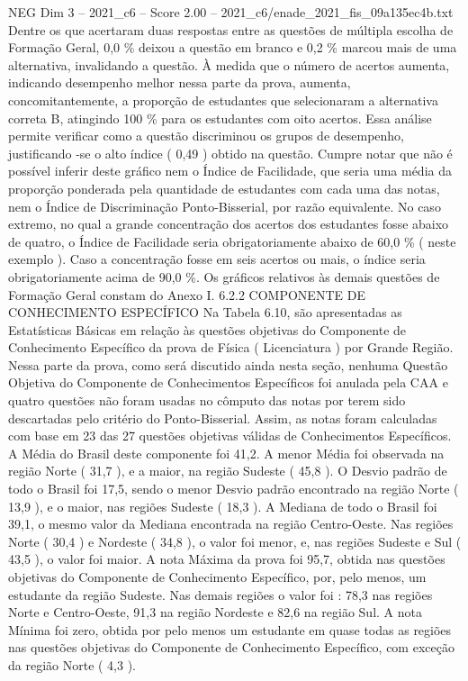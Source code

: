 \begin{textsample}{NEG Dim 3 – 2021\_c6 – Score 2.00 – 2021\_c6/enade\_2021\_fis\_09a135ec4b.txt}
Dentre os que acertaram duas respostas entre as questões de múltipla escolha de Formação Geral, 0,0 \% deixou a questão em branco e 0,2 \% marcou mais de uma alternativa, invalidando a questão.
À medida que o número de acertos aumenta, indicando desempenho melhor nessa parte da prova, aumenta, concomitantemente, a proporção de estudantes que selecionaram a alternativa correta B, atingindo 100 \% para os estudantes com oito acertos.
Essa análise permite verificar como a questão discriminou os grupos de desempenho, justificando -se o alto índice ( 0,49 ) obtido na questão.
Cumpre notar que não é possível inferir deste gráfico nem o Índice de Facilidade, que seria uma média da proporção ponderada pela quantidade de estudantes com cada uma das notas, nem o Índice de Discriminação Ponto-Bisserial, por razão equivalente.
No caso extremo, no qual a grande concentração dos acertos dos estudantes fosse abaixo de quatro, o Índice de Facilidade seria obrigatoriamente abaixo de 60,0 \% ( neste exemplo ).
Caso a concentração fosse em seis acertos ou mais, o índice seria obrigatoriamente acima de 90,0 \%.
Os gráficos relativos às demais questões de Formação Geral constam do Anexo I. 6.2.2 COMPONENTE DE CONHECIMENTO ESPECÍFICO Na Tabela 6.10, são apresentadas as Estatísticas Básicas em relação às questões objetivas do Componente de Conhecimento Específico da prova de Física ( Licenciatura ) por Grande Região.
Nessa parte da prova, como será discutido ainda nesta seção, nenhuma Questão Objetiva do Componente de Conhecimentos Específicos foi anulada pela CAA e quatro questões não foram usadas no cômputo das notas por terem sido descartadas pelo critério do Ponto-Bisserial.
Assim, as notas foram calculadas com base em 23 das 27 questões objetivas válidas de Conhecimentos Específicos.
A Média do Brasil deste componente foi 41,2.
A menor Média foi observada na região Norte ( 31,7 ), e a maior, na região Sudeste ( 45,8 ).
O Desvio padrão de todo o Brasil foi 17,5, sendo o menor Desvio padrão encontrado na região Norte ( 13,9 ), e o maior, nas regiões Sudeste ( 18,3 ).
A Mediana de todo o Brasil foi 39,1, o mesmo valor da Mediana encontrada na região Centro-Oeste.
Nas regiões Norte ( 30,4 ) e Nordeste ( 34,8 ), o valor foi menor, e, nas regiões Sudeste e Sul ( 43,5 ), o valor foi maior.
A nota Máxima da prova foi 95,7, obtida nas questões objetivas do Componente de Conhecimento Específico, por, pelo menos, um estudante da região Sudeste.
Nas demais regiões o valor foi : 78,3 nas regiões Norte e Centro-Oeste, 91,3 na região Nordeste e 82,6 na região Sul.
A nota Mínima foi zero, obtida por pelo menos um estudante em quase todas as regiões nas questões objetivas do Componente de Conhecimento Específico, com exceção da região Norte ( 4,3 ).

\end{textsample}
